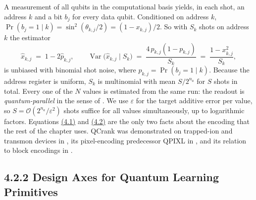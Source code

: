 \documentclass{report}
\theoremstyle{plain}
\theoremstyle{definition}
\theoremstyle{remark}
\newcommand{\bigO}[1]{\mathcal{O}\!\left(#1\right)}
\newcommand{\eps}{\varepsilon}
\begin{document}
A measurement of all qubits in the computational basis yields, in each shot, an address $k$ and a bit $b_j$ for every data qubit. Conditioned on address $k$, $\Pr(b_j = 1 \mid k) = \sin^2(\theta_{k,j}/2) = (1 - x_{k,j})/2$. So with $S_k$ shots on address $k$ the estimator
\hypertarget{eq:qml:readout}{}\[
\hat{x}_{k,j} \;=\; 1 - 2\hat{p}_{k,j}, \qquad
\operatorname{Var}\big(\hat{x}_{k,j} \mid S_k\big) \;=\; \frac{4\,p_{k,j}(1-p_{k,j})}{S_k} \;=\; \frac{1 - x_{k,j}^2}{S_k},
\tag{4.2}\]
is unbiased with binomial shot noise, where $p_{k,j} = \Pr(b_j = 1 \mid k)$. Because the address register is uniform, $S_k$ is multinomial with mean $S/2^{n_a}$ for $S$ shots in total. Every one of the $N$ values is estimated from the same run: the readout is \emph{quantum-parallel} in the sense of \cite{balewski2024qcrank}. We use $\eps$ for the target additive error per value, so $S = \bigO{2^{n_a}/\eps^2}$ shots suffice for all values simultaneously, up to logarithmic factors. Equations \hyperref[eq:qml:qcrank]{(4.1)} and \hyperref[eq:qml:readout]{(4.2)} are the only two facts about the encoding that the rest of the chapter uses. QCrank was demonstrated on trapped-ion and transmon devices in \cite{balewski2024qcrank}, its pixel-encoding predecessor QPIXL in \cite{amankwah2022qpixl}, and its relation to block encodings in \cite{camps2022fable}.

\subsection{4.2.2 Design Axes for Quantum Learning Primitives}\label{sec:qml:prelim:axes}
\end{document}
